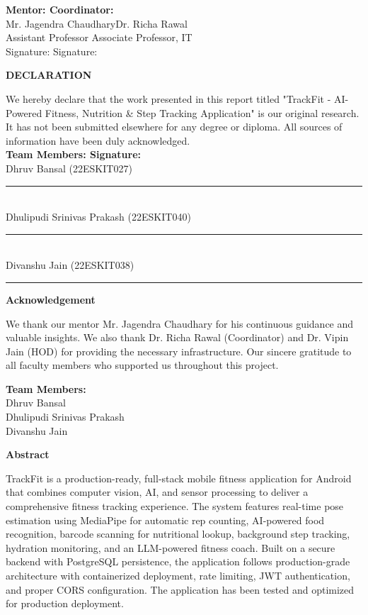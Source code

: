 \documentclass[12pt]{report}
\newcommand{\projecttitle}{TrackFit - AI-Powered Fitness, Nutrition \& Step Tracking Application}
\newcommand{\mentorname}{Mr. Jagendra Chaudhary}
\newcommand{\coordinatorname}{Dr. Richa Rawal}
\begin{document}
\textbf{Mentor: \hfill Coordinator: \hspace{1.5cm}} \\
\mentorname \hfill \coordinatorname \hspace{1.8cm} \\
Assistant Professor \hfill Associate Professor, IT \hspace{1.0cm} \\
Signature: \hfill Signature: \hspace{3.0cm}

\newpage
\begin{center}
    \begin{Large}
        \textbf{DECLARATION}
    \end{Large}
\end{center}
We hereby declare that the work presented in this report titled "\projecttitle" is our original research. It has not been submitted elsewhere for any degree or diploma. All sources of information have been duly acknowledged. \\[0.7cm]
\textbf{Team Members: \hfill Signature:} \\
Dhruv Bansal (22ESKIT027) \hfill \rule{3cm}{0.4pt} \\
Dhulipudi Srinivas Prakash (22ESKIT040) \hfill \rule{3cm}{0.4pt} \\
Divanshu Jain (22ESKIT038) \hfill \rule{3cm}{0.4pt}

\newpage
\begin{center}
    \begin{Large}
        \textbf{Acknowledgement}
    \end{Large}
\end{center}
We thank our mentor Mr. Jagendra Chaudhary for his continuous guidance and valuable insights. We also thank Dr. Richa Rawal (Coordinator) and Dr. Vipin Jain (HOD) for providing the necessary infrastructure. Our sincere gratitude to all faculty members who supported us throughout this project.

\vspace{1cm}
\textbf{Team Members:} \\
Dhruv Bansal \\
Dhulipudi Srinivas Prakash \\
Divanshu Jain

\newpage
\begin{center}
    \begin{Large}
        \textbf{Abstract}
    \end{Large}
\end{center}
TrackFit is a production-ready, full-stack mobile fitness application for Android that combines computer vision, AI, and sensor processing to deliver a comprehensive fitness tracking experience. The system features real-time pose estimation using MediaPipe for automatic rep counting, AI-powered food recognition, barcode scanning for nutritional lookup, background step tracking, hydration monitoring, and an LLM-powered fitness coach. Built on a secure backend with PostgreSQL persistence, the application follows production-grade architecture with containerized deployment, rate limiting, JWT authentication, and proper CORS configuration. The application has been tested and optimized for production deployment.
\end{document}
